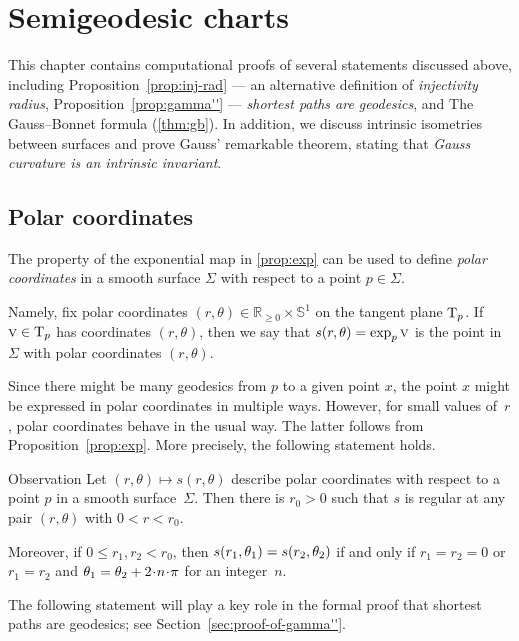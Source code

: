 \chapter{Semigeodesic charts}
\label{chap:semigeodesic}

This chapter contains computational proofs of several statements discussed above, including 
Proposition~\ref{prop:inj-rad} --- an alternative definition of \textit{injectivity radius},
Proposition~\ref{prop:gamma''} --- \textit{shortest paths are geodesics}, and
The Gauss--Bonnet formula (\ref{thm:gb}).
In addition, we discuss intrinsic isometries between surfaces and prove Gauss' remarkable theorem, stating that \textit{Gauss curvature is an intrinsic invariant}.

\section{Polar coordinates}

The property of the exponential map in \ref{prop:exp} can be used to define \emph{polar coordinates} in a smooth surface $\Sigma$ with respect to a point $p\in \Sigma$.

Namely, fix polar coordinates $(r,\theta) \in \mathbb{R}_{\ge0} \times \mathbb{S}^1  $ on the tangent plane $\mathrm{T}_p$.
If $\text{\sc{v}}\in \mathrm{T}_p$ has coordinates $(r,\theta)$,
then we say that $s(r,\theta)\z=\exp_p\vec v$ is the point in $\Sigma$ with  polar coordinates $(r,\theta)$.


Since there might be many geodesics from $p$ to a given point $x$,
the point $x$ might be expressed in polar coordinates in multiple ways.
However, for small values of~$r$,
polar coordinates behave in the usual way.
The latter follows from Proposition~\ref{prop:exp}.
More precisely, the following statement holds.

\begin{thm}{Observation}\label{obs:polar}
Let $(r,\theta)\mapsto s(r,\theta)$ describe polar coordinates with respect to a point $p$ in a  smooth surface~$\Sigma$.
Then there is $r_0>0$ such that $s$ is  regular at any pair $(r,\theta)$ with $0<r<r_0$.

Moreover, if $0\le r_1,r_2<r_0$, then $s(r_1,\theta_1) \z= s(r_2,\theta_2)$ if and only if
$r_1=r_2=0$ or $r_1=r_2$ and $\theta_1\z=\theta_2+2\cdot n\cdot\pi$ for an integer~$n$.
\end{thm}

The following statement will play a key role in the formal proof that shortest paths are geodesics; see Section~\ref{sec:proof-of-gamma''}.

